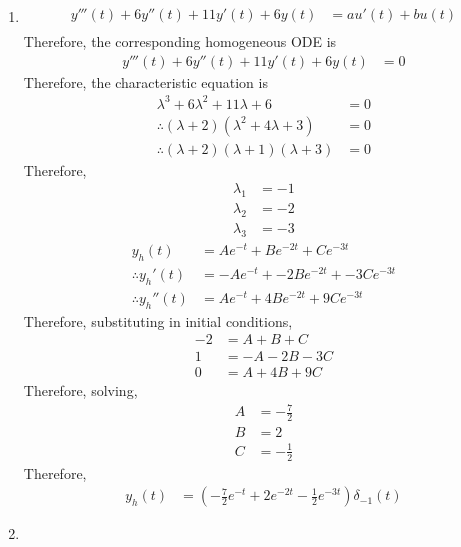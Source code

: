 \documentclass[fleqn, a4paper, 11pt, oneside]{amsart}
\theoremstyle{definition}
\theoremstyle{theorem}
\begin{document}
\begin{solution}
	\begin{enumerate}[leftmargin=*]
		\item
			\begin{align*}
				y'''(t) + 6 y''(t) + 11 y'(t) + 6 y(t) & = a u'(t) + b u(t) \\
			\end{align*}
			Therefore, the corresponding homogeneous ODE is
			\begin{align*}
				y'''(t) + 6 y''(t) + 11 y'(t) + 6 y(t) & = 0
			\end{align*}
			Therefore, the characteristic equation is
			\begin{align*}
				\lambda^3 + 6 \lambda^2 + 11 \lambda + 6             & = 0 \\
				\therefore (\lambda + 2) (\lambda^2 + 4 \lambda + 3) & = 0 \\
				\therefore (\lambda + 2) (\lambda + 1) (\lambda + 3) & = 0
			\end{align*}
			Therefore,
			\begin{align*}
				\lambda_1 & = -1 \\
				\lambda_2 & = -2 \\
				\lambda_3 & = -3
			\end{align*}
			\begin{align*}
				y_h(t)                & = A e^{-t} + B e^{-2 t} + C e^{-3 t}        \\
				\therefore {y_h}'(t)  & = -A e^{-t} + -2 B e^{-2 t} + -3 C e^{-3 t} \\
				\therefore {y_h}''(t) & = A e^{-t} + 4 B e^{-2 t} + 9 C e^{-3 t}
			\end{align*}
			Therefore, substituting in initial conditions,
			\begin{align*}
				-2 & = A + B + C      \\
				1  & = -A - 2 B - 3 C \\
				0  & = A + 4 B + 9 C
			\end{align*}
			Therefore, solving,
			\begin{align*}
				A & = -\frac{7}{2} \\
				B & = 2            \\
				C & = -\frac{1}{2}
			\end{align*}
			Therefore,
			\begin{align*}
				y_h(t) & = \left( -\frac{7}{2} e^{-t} + 2 e^{-2 t} - \frac{1}{2} e^{-3 t} \right) \delta_{-1}(t)
			\end{align*}
		\item

\end{enumerate}
\end{solution}
\end{document}
